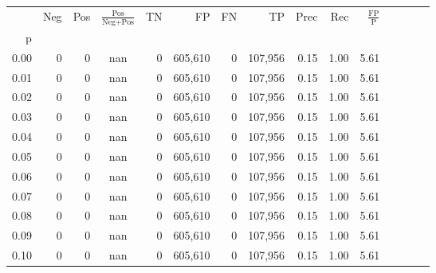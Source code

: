 \begin{tabular}{rrrcrrrrrrrrrrr}
\toprule
{} &      Neg &     Pos & $\frac{\text{Pos}}{\text{Neg}+\text{Pos}}$ &       TN &       FP &       FN &       TP &  Prec &   Rec & $\frac{\text{FP}}{\text{P}}$ \\
p    &          &         &                                            &          &          &          &          &       &       &                              \\
\midrule
0.00 &        0 &       0 &                                        nan &        0 &  605,610 &        0 &  107,956 &  0.15 &  1.00 &                         5.61 \\
0.01 &        0 &       0 &                                        nan &        0 &  605,610 &        0 &  107,956 &  0.15 &  1.00 &                         5.61 \\
0.02 &        0 &       0 &                                        nan &        0 &  605,610 &        0 &  107,956 &  0.15 &  1.00 &                         5.61 \\
0.03 &        0 &       0 &                                        nan &        0 &  605,610 &        0 &  107,956 &  0.15 &  1.00 &                         5.61 \\
0.04 &        0 &       0 &                                        nan &        0 &  605,610 &        0 &  107,956 &  0.15 &  1.00 &                         5.61 \\
0.05 &        0 &       0 &                                        nan &        0 &  605,610 &        0 &  107,956 &  0.15 &  1.00 &                         5.61 \\
0.06 &        0 &       0 &                                        nan &        0 &  605,610 &        0 &  107,956 &  0.15 &  1.00 &                         5.61 \\
0.07 &        0 &       0 &                                        nan &        0 &  605,610 &        0 &  107,956 &  0.15 &  1.00 &                         5.61 \\
0.08 &        0 &       0 &                                        nan &        0 &  605,610 &        0 &  107,956 &  0.15 &  1.00 &                         5.61 \\
0.09 &        0 &       0 &                                        nan &        0 &  605,610 &        0 &  107,956 &  0.15 &  1.00 &                         5.61 \\
0.10 &        0 &       0 &                                        nan &        0 &  605,610 &        0 &  107,956 &  0.15 &  1.00 &                         5.61 \\

\end{tabular}
